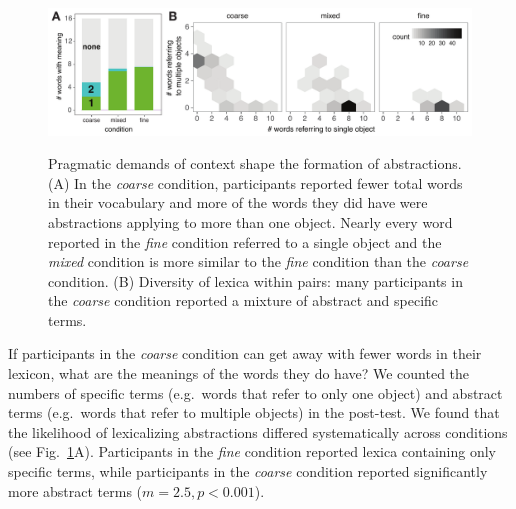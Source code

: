 \documentclass[10pt,letterpaper]{article}
\begin{document}
\begin{figure}[t]
\begin{center}
{\includegraphics[scale=0.75]{resultsFig_v1.pdf}}
{\caption{{Pragmatic demands of context shape the formation of abstractions. (A) 
In the \emph{coarse} condition, participants reported fewer total words in their vocabulary and more of the words they did have were abstractions applying to more than one object. %
Nearly every word reported in the \emph{fine} condition referred to a single object and the \emph{mixed} condition is more similar to the \emph{fine} condition than the \emph{coarse} condition. (B) Diversity of lexica within pairs: many participants in the \emph{coarse} condition reported a mixture of abstract and specific terms.%
\label{fig:lexiconContent}}}}
\end{center}
\end{figure}

If participants in the \emph{coarse} condition can get away with fewer words in their lexicon, what are the meanings of the words they do have? We counted the numbers of specific terms (e.g.\ words that refer to only one object) and abstract terms (e.g.\ words that refer to multiple objects) in the post-test. We found that the likelihood of lexicalizing abstractions differed systematically across conditions (see Fig.\ \ref{fig:lexiconContent}A). Participants in the \emph{fine} condition reported lexica containing only specific terms, while participants in the \emph{coarse} condition reported significantly more abstract terms ($m = 2.5, p < 0.001$). 
\end{document}

